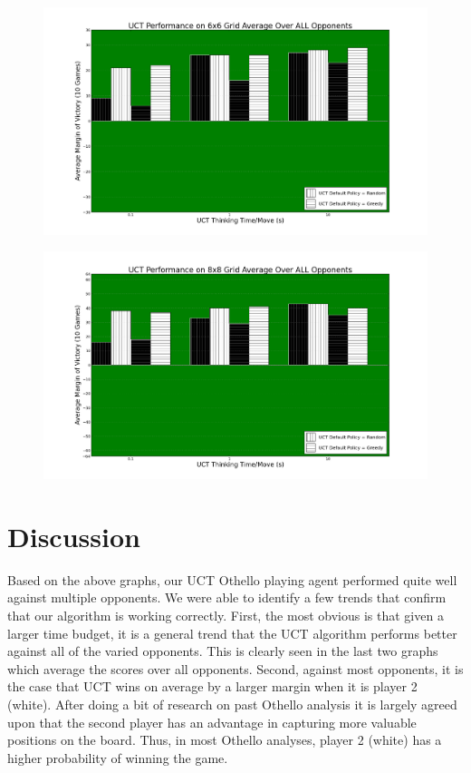 \documentclass[12pt,letterpaper]{article}
\begin{document}
\begin{figure}[!hp]
\begin{center}
\includegraphics[scale=.4]{66_ALL}
\end{center}
\end{figure}

\begin{figure}[!hp]
\begin{center}
\includegraphics[scale=.4]{88_ALL}
\end{center}
\end{figure}


\pagebreak
\section{Discussion}
\label{disc}
Based on the above graphs, our UCT Othello playing agent performed quite well against multiple opponents. We were able to identify a few trends that confirm that our algorithm is working correctly.  First, the most obvious is that given a larger time budget, it is a general trend that the UCT algorithm performs better against all of the varied opponents. This is clearly seen in the last two graphs which average the scores over all opponents. Second, against most opponents, it is the case that UCT wins on average by a larger margin when it is player 2 (white). After doing a bit of research on past Othello analysis it is largely agreed upon that the second player has an advantage in capturing more valuable positions on the board. Thus, in most Othello analyses, player 2 (white) has a higher probability of winning the game. 
\end{document}
